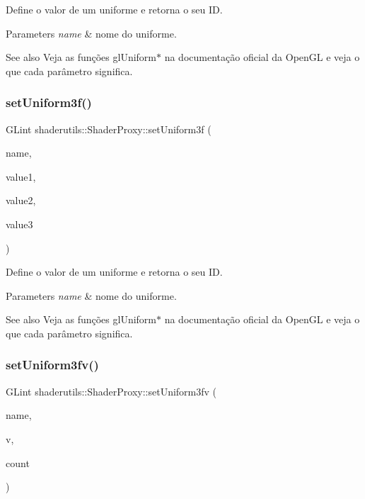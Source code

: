 Define o valor de um uniforme e retorna o seu ID. 
\begin{DoxyParams}{Parameters}
{\em name} & nome do uniforme. \\
\hline
\end{DoxyParams}
\begin{DoxySeeAlso}{See also}
Veja as funções gl\+Uniform$\ast$ na documentação oficial da Open\+GL e veja o que cada parâmetro significa. 
\end{DoxySeeAlso}
\mbox{\label{classshaderutils_1_1_shader_proxy_a9c74243f8b3f9ea4ec1f7053e296e4bb}} 
\subsubsection{\texorpdfstring{set\+Uniform3f()}{setUniform3f()}}
{\footnotesize\ttfamily G\+Lint shaderutils\+::\+Shader\+Proxy\+::set\+Uniform3f (\begin{DoxyParamCaption}\item[{const char $\ast$}]{name,  }\item[{G\+Lfloat}]{value1,  }\item[{G\+Lfloat}]{value2,  }\item[{G\+Lfloat}]{value3 }\end{DoxyParamCaption})\hspace{0.3cm}{\ttfamily [inline]}}

Define o valor de um uniforme e retorna o seu ID. 
\begin{DoxyParams}{Parameters}
{\em name} & nome do uniforme. \\
\hline
\end{DoxyParams}
\begin{DoxySeeAlso}{See also}
Veja as funções gl\+Uniform$\ast$ na documentação oficial da Open\+GL e veja o que cada parâmetro significa. 
\end{DoxySeeAlso}
\mbox{\label{classshaderutils_1_1_shader_proxy_a1bfafd1ad1473d2bd5b5f0fb3efe4a83}} 
\subsubsection{\texorpdfstring{set\+Uniform3fv()}{setUniform3fv()}}
{\footnotesize\ttfamily G\+Lint shaderutils\+::\+Shader\+Proxy\+::set\+Uniform3fv (\begin{DoxyParamCaption}\item[{const char $\ast$}]{name,  }\item[{const G\+Lfloat $\ast$}]{v,  }\item[{G\+Luint}]{count }\end{DoxyParamCaption})\hspace{0.3cm}{\ttfamily [inline]}}

